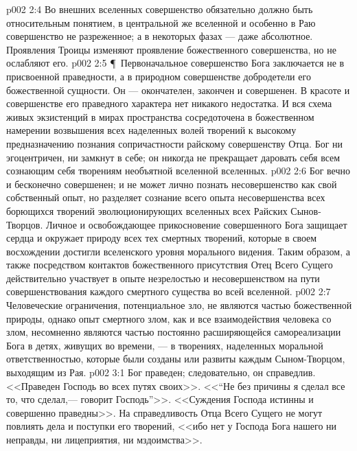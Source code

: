 \vs p002 2:4 Во внешних вселенных совершенство обязательно должно быть относительным понятием, в центральной же вселенной и особенно в Раю совершенство не разреженное; а в некоторых фазах --- даже абсолютное. Проявления Троицы изменяют проявление божественного совершенства, но не ослабляют его.
\vs p002 2:5 \P\ Первоначальное совершенство Бога заключается не в присвоенной праведности, а в природном совершенстве добродетели его божественной сущности. Он --- окончателен, закончен и совершенен. В красоте и совершенстве его праведного характера нет никакого недостатка. И вся схема живых экзистенций в мирах пространства сосредоточена в божественном намерении возвышения всех наделенных волей творений к высокому предназначению познания сопричастности райскому совершенству Отца. Бог ни эгоцентричен, ни замкнут в себе; он никогда не прекращает даровать себя всем сознающим себя творениям необъятной вселенной вселенных.
\vs p002 2:6 Бог вечно и бесконечно совершенен; и не может лично познать несовершенство как свой собственный опыт, но разделяет сознание всего опыта несовершенства всех борющихся творений эволюционирующих вселенных всех Райских Сынов\hyp{}Творцов. Личное и освобождающее прикосновение совершенного Бога защищает сердца и окружает природу всех тех смертных творений, которые в своем восхождении достигли вселенского уровня морального видения. Таким образом, а также посредством контактов божественного присутствия Отец Всего Сущего действительно участвует в опыте  незрелостью и несовершенством на пути совершенствования каждого смертного существа во всей вселенной.
\vs p002 2:7 Человеческие ограничения, потенциальное зло, не являются частью божественной природы, однако опыт смертного  злом, как и все взаимодействия человека со злом, несомненно являются частью постоянно расширяющейся самореализации Бога в детях, живущих во времени, --- в творениях, наделенных моральной ответственностью, которые были созданы или развиты каждым Сыном\hyp{}Творцом, выходящим из Рая.
\vs p002 3:1 Бог праведен; следовательно, он справедлив. <<Праведен Господь во всех путях своих>>. <<“Не без причины я сделал все то, что сделал,--- говорит Господь”>>. <<Суждения Господа истинны и совершенно праведны>>. На справедливость Отца Всего Сущего не могут повлиять дела и поступки его творений, <<ибо нет у Господа Бога нашего ни неправды, ни лицеприятия, ни мздоимства>>.
